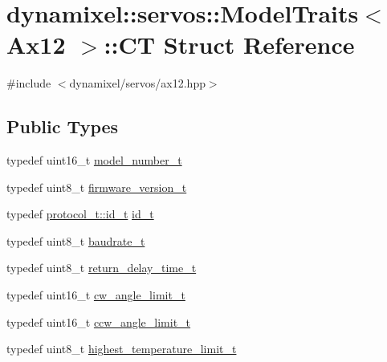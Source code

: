 \hypertarget{structdynamixel_1_1servos_1_1_model_traits_3_01_ax12_01_4_1_1_c_t}{}\section{dynamixel\+:\+:servos\+:\+:Model\+Traits$<$ Ax12 $>$\+:\+:CT Struct Reference}
\label{structdynamixel_1_1servos_1_1_model_traits_3_01_ax12_01_4_1_1_c_t}


{\ttfamily \#include $<$dynamixel/servos/ax12.\+hpp$>$}

\subsection*{Public Types}
\begin{DoxyCompactItemize}
\item 
typedef uint16\+\_\+t \hyperlink{structdynamixel_1_1servos_1_1_model_traits_3_01_ax12_01_4_1_1_c_t_af7cc7d1015e115bb5cee55f69160a20b}{model\+\_\+number\+\_\+t}
\item 
typedef uint8\+\_\+t \hyperlink{structdynamixel_1_1servos_1_1_model_traits_3_01_ax12_01_4_1_1_c_t_a081478d3259bb860884584ad45f345f5}{firmware\+\_\+version\+\_\+t}
\item 
typedef \hyperlink{classdynamixel_1_1protocols_1_1_protocol1_a1d4dfa22b01f80b1876d14f539d52b5c}{protocol\+\_\+t\+::id\+\_\+t} \hyperlink{structdynamixel_1_1servos_1_1_model_traits_3_01_ax12_01_4_1_1_c_t_a0c872d4cb05d243b3a1ad358a6b036b4}{id\+\_\+t}
\item 
typedef uint8\+\_\+t \hyperlink{structdynamixel_1_1servos_1_1_model_traits_3_01_ax12_01_4_1_1_c_t_a72a5f288d96c6eceb04aaf15d0006da1}{baudrate\+\_\+t}
\item 
typedef uint8\+\_\+t \hyperlink{structdynamixel_1_1servos_1_1_model_traits_3_01_ax12_01_4_1_1_c_t_a6dca5b5fe3adf16a9fa8ccc9d26a08a6}{return\+\_\+delay\+\_\+time\+\_\+t}
\item 
typedef uint16\+\_\+t \hyperlink{structdynamixel_1_1servos_1_1_model_traits_3_01_ax12_01_4_1_1_c_t_a6f204c4baeeeaa1c8a78b3660db77b93}{cw\+\_\+angle\+\_\+limit\+\_\+t}
\item 
typedef uint16\+\_\+t \hyperlink{structdynamixel_1_1servos_1_1_model_traits_3_01_ax12_01_4_1_1_c_t_a6c07271575b0f9d66e3629b163cc87e3}{ccw\+\_\+angle\+\_\+limit\+\_\+t}
\item 
typedef uint8\+\_\+t \hyperlink{structdynamixel_1_1servos_1_1_model_traits_3_01_ax12_01_4_1_1_c_t_a927ba4cfd2e68533b00e9db76589297e}{highest\+\_\+temperature\+\_\+limit\+\_\+t}

\end{DoxyCompactItemize}

